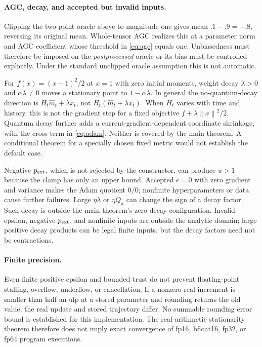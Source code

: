 \documentclass[11pt]{article}
\theoremstyle{definition}
\theoremstyle{remark}
\newcommand{\norm}[1]{\left\lVert#1\right\rVert}
\begin{document}
\paragraph{AGC, decay, and accepted but invalid inputs.}
Clipping the two-point oracle above to magnitude one gives mean $.1-.9=-.8$,
reversing its original mean. Whole-tensor AGC realizes this at a parameter
norm and AGC coefficient whose threshold in \eqref{eq:agc} equals one.
Unbiasedness must therefore be imposed on the \emph{postprocessed} oracle or
its bias must be controlled explicitly. Under the standard unclipped oracle
assumption this is not automatic.

For $f(x)=(x-1)^2/2$ at $x=1$ with zero initial moments, weight decay
$\lambda>0$ and $\alpha\lambda\ne0$ moves a stationary point to
$1-\alpha\lambda$. In general the no-quantum-decay direction is
$H_t\widehat m_t+\lambda x_t$, not $H_t(\widehat m_t+\lambda x_t)$.
When $H_t$ varies with time and history, this is not the gradient step for a
fixed objective $f+\lambda\norm{x}^2/2$. Quantum decay further adds a
current-gradient-dependent coordinate shrinkage, with the cross term in
\eqref{eq:adam}. Neither is covered by the main theorem. A conditional theorem
for a specially chosen fixed metric would not establish the default case.

Negative $p_{\rm ext}$, which is not rejected by the constructor, can produce
$u>1$ because the clamp has only an upper bound. Accepted $\epsilon=0$ with
zero gradient and variance makes the Adam quotient $0/0$; nonfinite
hyperparameters or data cause further failures. Large $\eta\lambda$ or
$\eta Q_k$ can change the sign of a decay factor. Such decay is outside the
main theorem's zero-decay configuration. Invalid epsilon, negative
$p_{\rm ext}$, and nonfinite inputs are outside the analytic domain;
large positive decay products can be legal finite inputs, but the decay
factors need not be contractions.

\paragraph{Finite precision.}
Even finite positive epsilon and bounded trust do not prevent floating-point
stalling, overflow, underflow, or cancellation. If a nonzero real increment
is smaller than half an ulp at a stored parameter and rounding returns the
old value, the real update and stored trajectory differ. No summable rounding
error bound is established for this implementation. The real-arithmetic
stationarity theorem therefore does not imply exact convergence of fp16,
bfloat16, fp32, or fp64 program executions.
\end{document}
